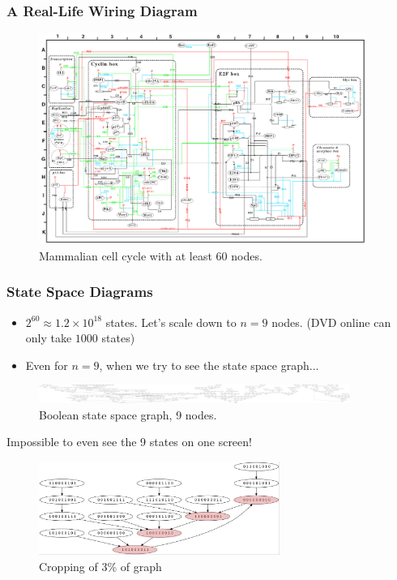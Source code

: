 \documentclass{beamer}
\begin{document}
\begin{frame}
 \frametitle{A Real-Life Wiring Diagram}
\begin{figure}
    \vspace{-10pt}
    \caption{Mammalian cell cycle with at least 60 nodes.}
    \centering
    \includegraphics[width = 0.95\textwidth]{hugewiringdiagram.jpg}
    \vspace{-10pt}
\end{figure}
\end{frame}

\begin{frame}
 \frametitle{State Space Diagrams}
\begin{itemize}
 \item $2^{60} \approx 1.2 \times 10^{18}$ states. Let's scale down to $n = 9$ nodes. (DVD online can only take $1000$ states)
 \item Even for $n = 9$, when we try to see the state space graph...
\end{itemize}
\begin{figure}
    \caption{Boolean state space graph, 9 nodes.}
    \centering
    \includegraphics[width = 4in]{9states-1.jpg}
\end{figure}
Impossible to even see the 9 states on one screen!
\begin{figure}
    \caption{Cropping of 3\% of graph}
    \centering
    \includegraphics[width = 0.7\textwidth]{network.jpg}
\end{figure}
\end{frame}
\end{document}

